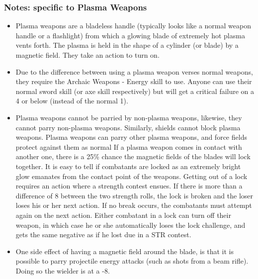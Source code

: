 \documentclass[twoside]{book}
\begin{document}
    

\subsubsection{Notes: specific to Plasma Weapons}
    
\begin{itemize}
      
  \item  Plasma weapons are a bladeless handle (typically
                   looks like a normal weapon handle or a flashlight)
                   from which a glowing blade of extremely hot plasma
                   vents forth. The plasma is held in the shape of a
                   cylinder (or blade) by a magnetic field. They take an
                   action to turn on. 
  \item  Due to the difference between using a plasma
                   weapon verses normal weapons, they require the Archaic
                   Weapons - Energy skill to use. Anyone can use their
                   normal sword skill (or axe skill respectively) but
                   will get a critical failure on a 4 or below (instead
                   of the normal 1). 
  \item  Plasma weapons cannot be parried by non-plasma
                   weapons, likewise, they cannot parry non-plasma
                   weapons. Similarly, shields cannot block plasma
                   weapons. Plasma weapons can parry other plasma
                   weapons, and force fields protect against them as
                   normal If a plasma weapon comes in contact with
                   another one, there is a 25\% chance the magnetic fields
                   of the blades will lock together. It is easy to tell
                   if combatants are locked as an extremely bright glow
                   emanates from the contact point of the weapons.
                   Getting out of a lock requires an action where a
                   strength contest ensues. If there is more than a
                   difference of 8 between the two strength rolls, the
                   lock is broken and the loser loses his or her next
                   action. If no break occurs, the combatants must
                   attempt again on the next action. Either combatant in
                   a lock can turn off their weapon, in which case he or
                   she automatically loses the lock challenge, and gets
                   the same negative as if he lost due in a STR contest.
                   
  \item  One side effect of having a magnetic field
                   around the blade, is that it is possible to parry
                   projectile energy attacks (such as shots from a beam
                   rifle). Doing so the wielder is at a -8. 
\end{itemize}
  
\end{document}
